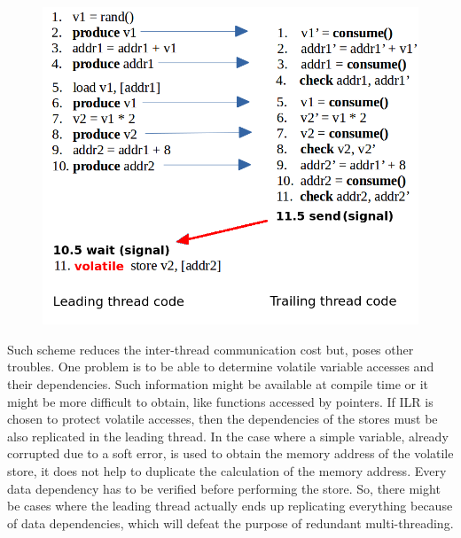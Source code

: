 \begin{figure}[H]
	\centering
	\includegraphics[scale=0.5]{images/Semi-Sync-Communication.png}
	\label{fig:SemiSyncRMT}
\end{figure}

Such scheme reduces the inter-thread communication cost but, poses other troubles. One problem is to be able to determine volatile variable accesses and their dependencies. Such information might be available at compile time or it might be more difficult to obtain, like functions accessed by pointers. If ILR is chosen to protect volatile accesses, then the dependencies of the stores must be also replicated in the leading thread. In the case where a simple variable, already corrupted due to a soft error, is used to obtain the memory address of the volatile store, it does not help to duplicate the calculation of the memory address. Every data dependency has to be verified before performing the store. So, there might be cases where the leading thread actually ends up replicating everything because of data dependencies, which will defeat the purpose of redundant multi-threading. 

